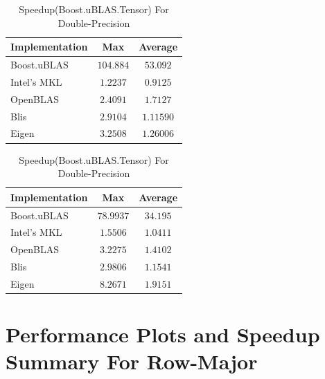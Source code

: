 \begin{table}[ht]
    \centering
    \caption{Speedup(Boost.uBLAS.Tensor) For Single-Precision}
    \begin{tabular}{|l|c|c|}
        \hline
        \textbf{Implementation} & \textbf{Max} & \textbf{Average}\\
        \hline
        Boost.uBLAS         & $104.884$ & $53.092$ \\
        \hline
        Intel's MKL         & $1.2237$ & $0.9125$ \\
        \hline
        OpenBLAS            & $2.4091$ & $1.7127$ \\
        \hline
        Blis                & $2.9104$ & $1.11590$ \\
        \hline
        Eigen               & $3.2508$ & $1.26006$ \\
        \hline
    \end{tabular}

    \vspace*{1 cm}

    \centering
    \caption{Speedup(Boost.uBLAS.Tensor) For Double-Precision}
    \begin{tabular}{|l|c|c|}
        \hline
        \textbf{Implementation} & \textbf{Max} & \textbf{Average}\\
        \hline
        Boost.uBLAS         & $78.9937$ & $34.195$ \\
        \hline
        Intel's MKL         & $1.5506$ & $1.0411$ \\
        \hline
        OpenBLAS            & $3.2275$ & $1.4102$ \\
        \hline
        Blis                & $2.9806$ & $1.1541$ \\
        \hline
        Eigen               & $8.2671$ & $1.9151$ \\
        \hline
    \end{tabular}
\end{table}

\clearpage
\section{Performance Plots and Speedup Summary For Row-Major}

